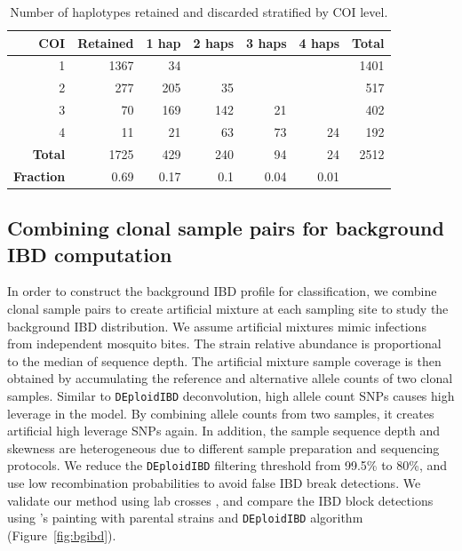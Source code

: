 \documentclass[9pt,lineno]{elife}
\begin{document}
\begin{table}[ht]
\centering
\begin{tabular}{r|r|r|r|r|r|r}
\textbf{COI}  & \textbf{Retained} & \textbf{1 hap} &\textbf{2 haps} & \textbf{3 haps} & \textbf{4 haps} & \textbf{Total} \\
\hline
1 & 1367 & 34 & & & & 1401 \\
2 & 277 & 205 & 35 & & & 517 \\
3 & 70 & 169 & 142 & 21 & & 402 \\
4 & 11 & 21 & 63 & 73 & 24 & 192 \\
\hline
\textbf{Total} & 1725 & 429 & 240 & 94 & 24 & 2512 \\
\hline
\textbf{Fraction} & 0.69 & 0.17 & 0.1 & 0.04 & 0.01 & \\
\end{tabular}
\vspace{.2cm}
\caption{Number of haplotypes retained and discarded stratified by COI level.}
\label{table:haps-discarded-by-COI}
\end{table}


\subsection{Combining clonal sample pairs for background IBD computation}
In order to construct the background IBD profile for classification, we combine clonal sample pairs to create artificial mixture at each sampling site to study the background IBD distribution. We assume artificial mixtures mimic infections from independent mosquito bites. The strain relative abundance is proportional to the median of sequence depth. The artificial mixture sample coverage is then obtained by accumulating the reference and alternative allele counts of two clonal samples. Similar to {\tt DEploidIBD} deconvolution, high allele count SNPs causes high leverage in the model. By combining allele counts from two samples, it creates artificial high leverage SNPs again. In addition, the sample sequence depth and skewness are heterogeneous due to different sample preparation and sequencing protocols. We reduce the {\tt DEploidIBD} filtering threshold from 99.5\% to 80\%, and use low recombination probabilities to avoid false IBD break detections. We validate our method using lab crosses \citep{Miles2016}, and compare the IBD block detections using \citet{Li2003}'s painting with parental strains and {\tt DEploidIBD} algorithm (Figure~\ref{fig:bgibd}).
\end{document}
